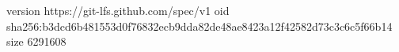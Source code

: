 version https://git-lfs.github.com/spec/v1
oid sha256:b3dcd6b481553d0f76832ecb9dda82de48ae8423a12f42582d73c3c6c5f66b14
size 6291608
